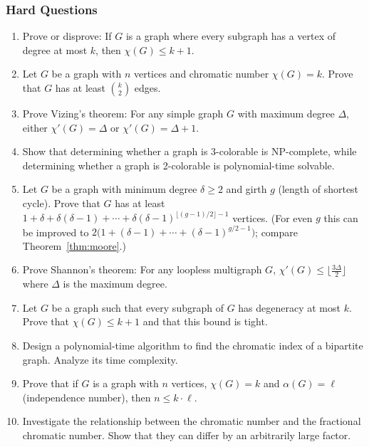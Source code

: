 \documentclass{article}
\theoremstyle{definition}
\begin{document}
\subsubsection{Hard Questions}
\begin{enumerate}[start=21]
\item Prove or disprove: If $G$ is a graph where every subgraph has a vertex of degree at most $k$, then $\chi(G) \leq k + 1$.

\item Let $G$ be a graph with $n$ vertices and chromatic number $\chi(G) = k$. Prove that $G$ has at least $\binom{k}{2}$ edges.

\item Prove Vizing's theorem: For any simple graph $G$ with maximum degree $\Delta$, either $\chi'(G) = \Delta$ or $\chi'(G) = \Delta + 1$.

\item Show that determining whether a graph is 3-colorable is NP-complete, while determining whether a graph is 2-colorable is polynomial-time solvable.

\item Let $G$ be a graph with minimum degree $\delta \geq 2$ and girth $g$ (length of shortest cycle). Prove that $G$ has at least $1 + \delta + \delta(\delta-1) + \cdots + \delta(\delta-1)^{\lfloor (g-1)/2 \rfloor - 1}$ vertices. (For even $g$ this can be improved to $2\big(1 + (\delta-1) + \cdots + (\delta-1)^{g/2 - 1}\big)$; compare Theorem~\ref{thm:moore}.)

\item Prove Shannon's theorem: For any loopless multigraph $G$, $\chi'(G) \leq \lfloor \frac{3\Delta}{2} \rfloor$ where $\Delta$ is the maximum degree.

\item Let $G$ be a graph such that every subgraph of $G$ has degeneracy at most $k$. Prove that $\chi(G) \leq k + 1$ and that this bound is tight.

\item Design a polynomial-time algorithm to find the chromatic index of a bipartite graph. Analyze its time complexity.

\item Prove that if $G$ is a graph with $n$ vertices, $\chi(G) = k$ and $\alpha(G) = \ell$ (independence number), then $n \leq k \cdot \ell$.

\item Investigate the relationship between the chromatic number and the fractional chromatic number. Show that they can differ by an arbitrarily large factor.
\end{enumerate}
\end{document}
